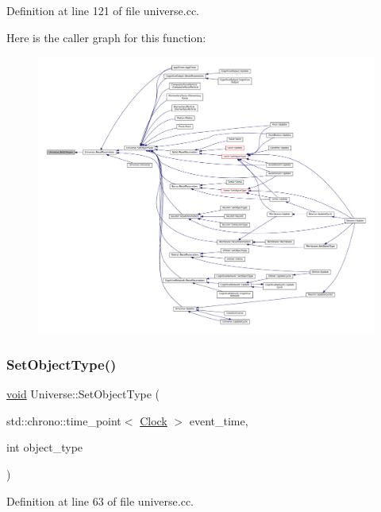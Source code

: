 Definition at line 121 of file universe.\+cc.

Here is the caller graph for this function\+:\nopagebreak
\begin{figure}[H]
\begin{center}
\leavevmode
\includegraphics[width=350pt]{class_universe_ac3443dd59b61ae3110f07f681f63ed0a_icgraph}
\end{center}
\end{figure}
\mbox{\label{class_universe_a2274a54fbdc7504c897e4272162bf17a}} 
\subsubsection{\texorpdfstring{Set\+Object\+Type()}{SetObjectType()}}
{\footnotesize\ttfamily \mbox{\hyperlink{glad_8h_a950fc91edb4504f62f1c577bf4727c29}{void}} Universe\+::\+Set\+Object\+Type (\begin{DoxyParamCaption}\item[{std\+::chrono\+::time\+\_\+point$<$ \mbox{\hyperlink{universe_8h_a0ef8d951d1ca5ab3cfaf7ab4c7a6fd80}{Clock}} $>$}]{event\+\_\+time,  }\item[{int}]{object\+\_\+type }\end{DoxyParamCaption})}



Definition at line 63 of file universe.\+cc.

